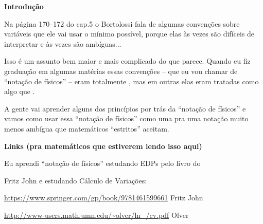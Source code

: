 \documentclass[oneside,12pt]{article}
\begin{document}
\newpage


{\bf Introdução}


Na página 170--172 do cap.5 o Bortolossi fala de algumas convenções
sobre variáveis que ele vai usar o mínimo possível, porque elas às
vezes são difíceis de interpretar e às vezes são ambíguas...

Isso é um assunto bem maior e mais complicado do que parece. Quando eu
fiz graduação em algumas matérias essas convenções -- que eu vou
chamar de ``notação de físicos'' -- eram totalmente
, mas em outras elas eram tratadas como algo
 que .

A gente vai aprender alguns dos princípios por trás da ``notação de
físicos'' e vamos como usar essa ``notação de físicos'' como uma
 pra uma notação muito menos ambígua que
matemáticos ``estritos'' aceitam.


\newpage


{\bf Links (pra matemáticos que estiverem lendo isso aqui)}

\msk

Eu aprendi ``notação de físicos'' estudando EDPs pelo livro do

Fritz John e estudando Cálculo de Variações:

\ssk

{\footnotesize

\url{https://www.springer.com/gp/book/9781461599661} Fritz John



\url{http://www-users.math.umn.edu/~olver/ln_/cv.pdf} Olver

}
\end{document}

